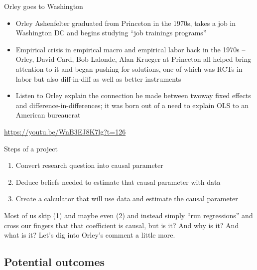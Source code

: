 \documentclass{beamer}
\begin{document}
\begin{frame}{Orley goes to Washington}

\begin{itemize}
\item Orley Ashenfelter graduated from Princeton in the 1970s, takes a job in Washington DC and begins studying ``job trainings programs''
\item Empirical crisis in empirical macro and empirical labor back in the 1970s -- Orley, David Card, Bob Lalonde, Alan Krueger at Princeton all helped bring attention to it and began pushing for solutions, one of which was RCTs in labor but also diff-in-diff as well as better instruments
\item Listen to Orley explain the connection he made between twoway fixed effects and difference-in-differences; it was born out of a need to explain OLS to an American bureaucrat

\end{itemize}

\url{https://youtu.be/WnB3EJ8K7lg?t=126}

\end{frame}

\begin{frame}{Steps of a project}

\begin{enumerate}
\item Convert research question into causal parameter
\item Deduce beliefs needed to estimate that causal parameter with data
\item Create a calculator that will use data and estimate the causal parameter
\end{enumerate}

\bigskip

Most of us skip (1) and maybe even (2) and instead simply ``run regressions'' and cross our fingers that that coefficient is causal, but is it? And why is it?  And what is it?  Let's dig into Orley's comment a little more. 

\end{frame}

\subsection{Potential outcomes}
\end{document}
